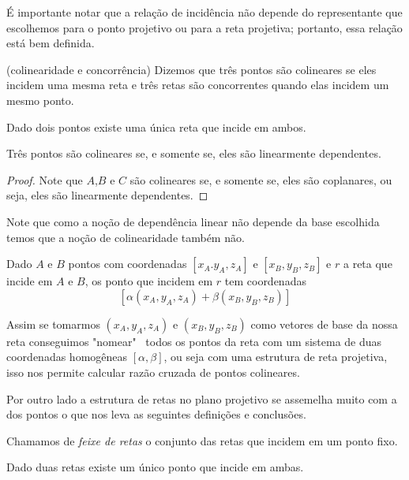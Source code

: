É importante notar que a relação de incidência não depende do representante que escolhemos para o ponto projetivo ou para a reta projetiva; portanto, essa relação está bem definida.

\begin{defn}(colinearidade e concorrência)
Dizemos que três pontos são colineares se eles incidem uma mesma reta e três retas são concorrentes quando elas incidem um mesmo ponto.
\end{defn}
\begin{prop}
Dado dois pontos existe uma única reta que incide em ambos.
\end{prop}




\begin{lem}
Três pontos são colineares se, e somente se, eles são linearmente dependentes.
\end{lem}
\begin{proof}
Note que $A$,$B$ e $C$ são colineares se, e somente se, eles são coplanares, ou seja, eles são linearmente dependentes.
\end{proof}

Note que como a noção de dependência linear não depende da base escolhida temos que a noção de colinearidade também não.

\begin{cor}
Dado $A$ e $B$ pontos com coordenadas $[x_A.y_A,z_A]$ e $[x_B,y_B,z_B]$ e $r$ a reta que incide em $A$ e $B$, os ponto que incidem em $r$ tem coordenadas \[[\alpha(x_A,y_A,z_A) +\beta(x_B,y_B,z_B)]\]
\end{cor}

Assim se tomarmos $(x_A,y_A,z_A)$ e $(x_B,y_B,z_B)$ como vetores de base da nossa reta conseguimos "nomear" \ todos os pontos da reta com um sistema de duas coordenadas homogêneas $[\alpha,\beta]$, ou seja com uma estrutura de reta projetiva, isso nos permite calcular razão cruzada de pontos colineares.

Por outro lado a estrutura de retas no plano projetivo se assemelha muito com a dos pontos o que nos leva as seguintes definições e conclusões.

\begin{defn}
Chamamos de \emph{feixe de retas} o conjunto das retas que incidem em um ponto fixo.
\end{defn}

\begin{prop}
Dado duas retas existe um único ponto que incide em ambas.
\end{prop}

